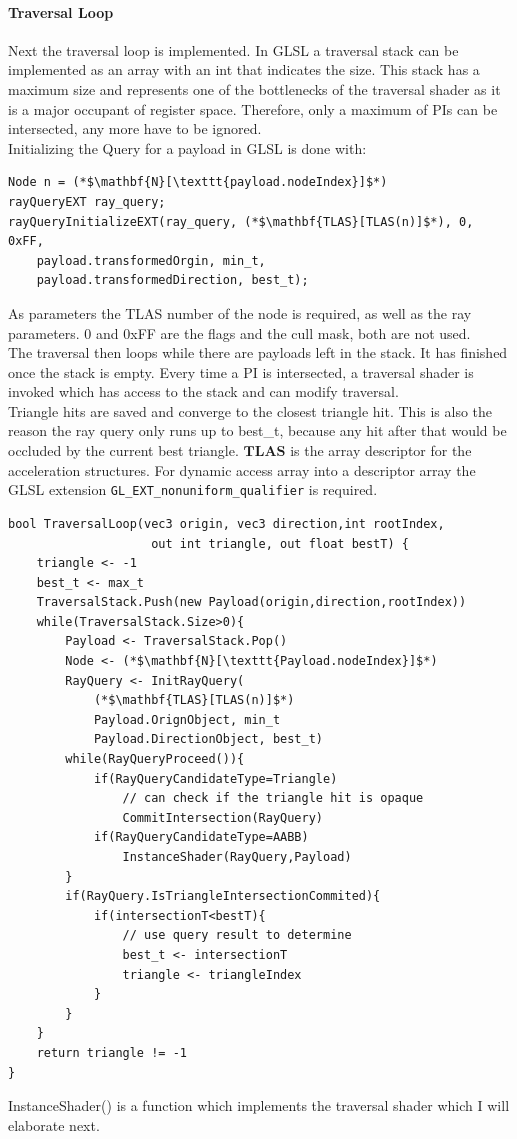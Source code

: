 \paragraph{Traversal Loop}
\label{sec:TraversalLoop}
Next the traversal loop is implemented. In GLSL a traversal stack can be implemented as an array with an int that indicates the size. This stack has a maximum size and represents one of the bottlenecks of the traversal shader as it is a major occupant of register space. Therefore, only a maximum of PIs can be intersected, any more have to be ignored.\\
Initializing the Query for a payload in GLSL is done with:
\begin{lstlisting}
Node n = (*$\mathbf{N}[\texttt{payload.nodeIndex}]$*)
rayQueryEXT ray_query;
rayQueryInitializeEXT(ray_query, (*$\mathbf{TLAS}[TLAS(n)]$*), 0, 0xFF,
	payload.transformedOrgin, min_t,
	payload.transformedDirection, best_t);
\end{lstlisting}
As parameters the TLAS number of the node is required, as well as the ray parameters. 0 and 0xFF are the flags and the cull mask, both are not used.\\
The traversal then loops while there are payloads left in the stack. It has finished once the stack is empty. Every time a PI is intersected, a traversal shader is invoked which has access to the stack and can modify traversal.\\
Triangle hits are saved and converge to the closest triangle hit. This is also the reason the ray query only runs up to best\_t, because any hit after that would be occluded by the current best triangle.
$\mathbf{TLAS}$ is the array descriptor for the acceleration structures. For dynamic access array into a descriptor array the GLSL extension \texttt{GL\_EXT\_nonuniform\_qualifier} is required.
\newpage
\begin{lstlisting}
bool TraversalLoop(vec3 origin, vec3 direction,int rootIndex, 
                    out int triangle, out float bestT) {
    triangle <- -1
    best_t <- max_t
    TraversalStack.Push(new Payload(origin,direction,rootIndex))
    while(TraversalStack.Size>0){
        Payload <- TraversalStack.Pop()
        Node <- (*$\mathbf{N}[\texttt{Payload.nodeIndex}]$*)
        RayQuery <- InitRayQuery(
            (*$\mathbf{TLAS}[TLAS(n)]$*)
            Payload.OrignObject, min_t
            Payload.DirectionObject, best_t)
        while(RayQueryProceed()){
            if(RayQueryCandidateType=Triangle)
                // can check if the triangle hit is opaque
                CommitIntersection(RayQuery)
            if(RayQueryCandidateType=AABB)
                InstanceShader(RayQuery,Payload)
        }
        if(RayQuery.IsTriangleIntersectionCommited){
            if(intersectionT<bestT){
                // use query result to determine 
                best_t <- intersectionT
                triangle <- triangleIndex
            }
        }
    }
    return triangle != -1
}
\end{lstlisting}
InstanceShader() is a function which implements the traversal shader which I will elaborate next.

